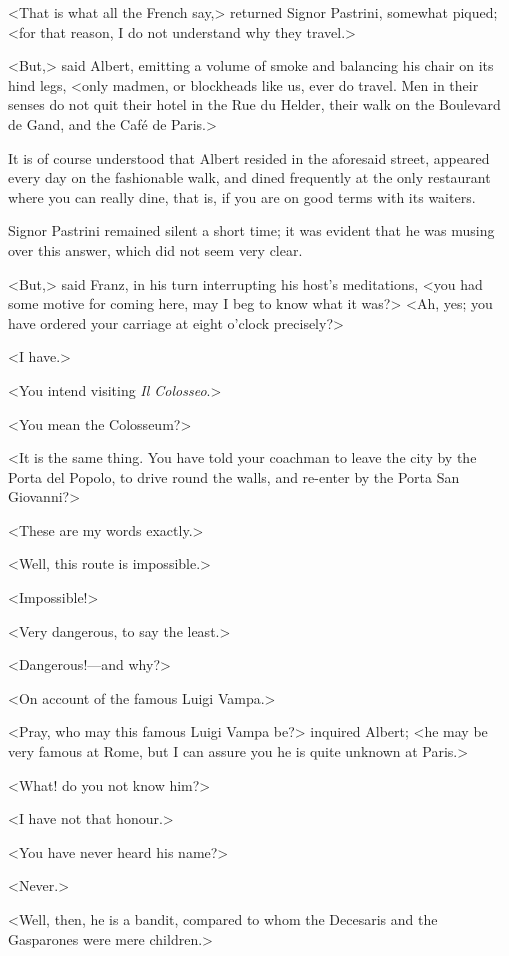  <That is what all the French say,> returned Signor Pastrini, somewhat piqued; <for that reason, I do not understand why they travel.> 

 <But,> said Albert, emitting a volume of smoke and balancing his chair on its hind legs, <only madmen, or blockheads like us, ever do travel. Men in their senses do not quit their hotel in the Rue du Helder, their walk on the Boulevard de Gand, and the Café de Paris.> 

 It is of course understood that Albert resided in the aforesaid street, appeared every day on the fashionable walk, and dined frequently at the only restaurant where you can really dine, that is, if you are on good terms with its waiters. 

 Signor Pastrini remained silent a short time; it was evident that he was musing over this answer, which did not seem very clear. 

 <But,> said Franz, in his turn interrupting his host's meditations, <you had some motive for coming here, may I beg to know what it was?>  <Ah, yes; you have ordered your carriage at eight o'clock precisely?> 

 <I have.> 

 <You intend visiting \textit{Il Colosseo}.> 

 <You mean the Colosseum?> 

 <It is the same thing. You have told your coachman to leave the city by the Porta del Popolo, to drive round the walls, and re-enter by the Porta San Giovanni?> 

 <These are my words exactly.> 

 <Well, this route is impossible.> 

 <Impossible!> 

 <Very dangerous, to say the least.> 

 <Dangerous!—and why?> 

 <On account of the famous Luigi Vampa.> 

 <Pray, who may this famous Luigi Vampa be?> inquired Albert; <he may be very famous at Rome, but I can assure you he is quite unknown at Paris.> 

 <What! do you not know him?> 

 <I have not that honour.> 

 <You have never heard his name?> 

 <Never.> 

 <Well, then, he is a bandit, compared to whom the Decesaris and the Gasparones were mere children.> 

